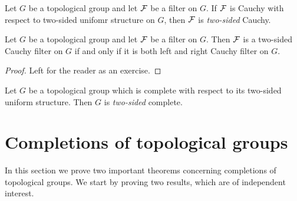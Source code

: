 \documentclass[10pt]{amsart}
\begin{document}
\begin{definition}
	Let $G$ be a topological group and let ${\mathcal F}$ be a filter on $G$. If ${\mathcal F}$ is Cauchy with respect to two-sided unifomr structure on $G$, then ${\mathcal F}$ is \textit{two-sided} Cauchy.
\end{definition}

\begin{fact}\label{fact:two_sided_Cauchy_filters}
	Let $G$ be a topological group and let ${\mathcal F}$ be a filter on $G$. Then ${\mathcal F}$ is a two-sided Cauchy filter on $G$ if and only if it is both left and right Cauchy filter on $G$.
\end{fact}
\begin{proof}
	Left for the reader as an exercise.
\end{proof}

\begin{definition}
	Let $G$ be a topological group which is complete with respect to its two-sided uniform structure. Then $G$ is \textit{two-sided} complete.
\end{definition}

\section{Completions of topological groups}
\noindent
In this section we prove two important theorems concerning completions of topological groups. We start by proving two results, which are of independent interest.
\end{document}
